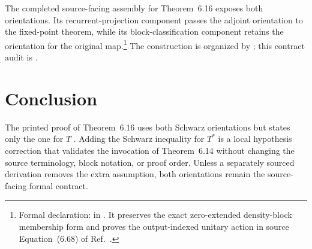 \documentclass{article}
\begin{document}
The completed source-facing assembly for Theorem~6.16 exposes both
orientations. Its recurrent-projection component passes the adjoint orientation
to the fixed-point theorem, while its block-classification component retains
the orientation for the original map.\footnote{Formal declaration:
 in
. It preserves the exact
zero-extended density-block membership form and proves the output-indexed
unitary action in source Equation~(6.68) of
Ref.~\cite{Wolf2012Quantum}.}
The construction is organized by ; this contract audit is
.

\section{Conclusion}

The printed proof of Theorem~6.16 uses both Schwarz orientations but states
only the one for $T$ \cite[Theorem~6.16]{Wolf2012Quantum}. Adding the Schwarz
inequality for $T^*$ is a local hypothesis correction that validates the
invocation of Theorem~6.14 without changing the source terminology, block
notation, or proof order. Unless a separately sourced derivation removes the
extra assumption, both orientations remain the source-facing formal contract.



\end{document}
